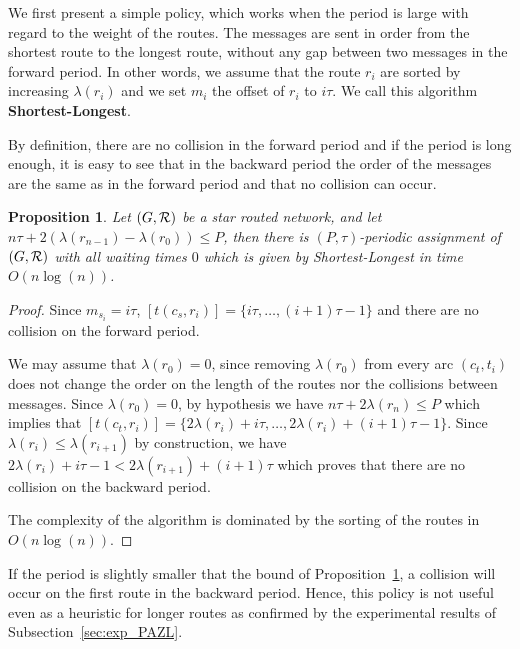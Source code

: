 \documentclass[10pt, conference, letterpaper]{IEEEtran}
\newtheorem{proposition}{Proposition}
\begin{document}
    We first present a simple policy, which works when the period is large with regard to the weight of the routes.
    The messages are sent in order from the shortest route to the longest route, without any gap between two messages in the forward period.
    In other words, we assume that the route $r_i$ are sorted by increasing $\lambda(r_i)$ and we set $m_{i}$ the offset of $r_i$ to $i\tau$. We call this algorithm {\bf Shortest-Longest}.
      
     By definition, there are no collision in the forward period and if the period is long enough, 
     it is easy to see that in the backward period the order of the messages are the same as in the forward period and that no collision can occur. 
      
      
      \begin{proposition} Let $(G, {\cal R})$ be a star routed network, and let $n\tau + 2(\lambda(r_{n-1}) - \lambda(r_{0})) \leq P$, then there is $(P,\tau)$-periodic assignment of $(G, {\cal R})$ with all waiting times $0$ which is given by Shortest-Longest in time $O(n\log(n))$.\label{prop:SL}
      \end{proposition}
      \begin{proof}
       Since $m_{s_i} = i\tau$, $[t(c_s,r_{i})] = \{i\tau,\dots, (i+1)\tau -1\}$ and there are no collision on the forward period.
       
       
       We may assume that $\lambda(r_{0}) = 0$, since removing $\lambda(r_{0})$ from every arc $(c_t,t_i)$ does not change the order on the length of the routes nor the collisions between messages.
       Since $\lambda(r_{0}) = 0$, by hypothesis we have $n\tau + 2\lambda(r_{n}) \leq P$ which implies that
       $[t(c_t,r_{i})] = \{2 \lambda(r_{i}) + i\tau, \dots,  2 \lambda(r_{i}) + (i+1)\tau -1\}$.
       Since $ \lambda(r_{i}) \leq  \lambda(r_{i+1})$ by construction, we have  $2 \lambda(r_{i}) + i\tau -1 < 2 \lambda(r_{i+1}) + (i+1)\tau$ which proves that there are no collision on the backward period. 
       
       The complexity of the algorithm is dominated by the sorting of the routes in $O(n\log(n))$. 
      \end{proof}

      If the period is slightly smaller that the bound of Proposition~\ref{prop:SL}, a collision will occur on the first route in the backward period. Hence, this policy is not useful even as a heuristic for longer routes as confirmed by the experimental results of Subsection~\ref{sec:exp_PAZL}. 
\end{document}
